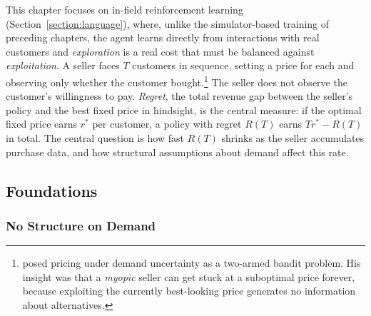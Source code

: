 This chapter focuses on in-field reinforcement learning (Section~\ref{section:language}), where, unlike the simulator-based training of preceding chapters, the agent learns directly from interactions with real customers and \textit{exploration} is a real cost that must be balanced against \textit{exploitation}. A seller faces $T$ customers in sequence, setting a price for each and observing only whether the customer bought.\footnote{\citet{Rothschild1974} posed pricing under demand uncertainty as a two-armed bandit problem. His insight was that a \textit{myopic} seller can get stuck at a suboptimal price forever, because exploiting the currently best-looking price generates no information about alternatives.} The seller does not observe the customer's willingness to pay. \textit{Regret}, the total revenue gap between the seller's policy and the best fixed price in hindsight, is the central measure: if the optimal fixed price earns $r^*$ per customer, a policy with regret $R(T)$ earns $T r^* - R(T)$ in total. The central question is how fast $R(T)$ shrinks as the seller accumulates purchase data, and how structural assumptions about demand affect this rate.

\subsection{Foundations}
\label{sec:dp_foundations}

\subsubsection{No Structure on Demand}
\label{sec:kleinberg}

